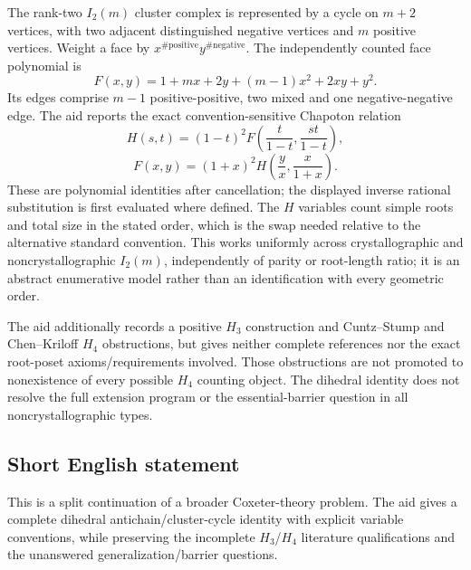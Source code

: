 \documentclass[11pt]{article}
\begin{document}
The rank-two \(I_2(m)\) cluster complex is represented by a cycle on \(m+2\) vertices, with two adjacent distinguished negative vertices and \(m\) positive vertices. Weight a face by \(x^{\#\mathrm{positive}}y^{\#\mathrm{negative}}\). The independently counted face polynomial is
\[
 F(x,y)=1+mx+2y+(m-1)x^2+2xy+y^2.
\]
Its edges comprise \(m-1\) positive-positive, two mixed and one negative-negative edge. The aid reports the exact convention-sensitive Chapoton relation
\[
 H(s,t)=(1-t)^2F\left(\frac{t}{1-t},\frac{st}{1-t}\right),
\]
\[
 F(x,y)=(1+x)^2H\left(\frac yx,\frac{x}{1+x}\right).
\]
These are polynomial identities after cancellation; the displayed inverse rational substitution is first evaluated where defined. The \(H\) variables count simple roots and total size in the stated order, which is the swap needed relative to the alternative standard convention. This works uniformly across crystallographic and noncrystallographic \(I_2(m)\), independently of parity or root-length ratio; it is an abstract enumerative model rather than an identification with every geometric order.

The aid additionally records a positive \(H_3\) construction and Cuntz--Stump and Chen--Kriloff \(H_4\) obstructions, but gives neither complete references nor the exact root-poset axioms/requirements involved. Those obstructions are not promoted to nonexistence of every possible \(H_4\) counting object. The dihedral identity does not resolve the full extension program or the essential-barrier question in all noncrystallographic types.
\subsection{Short English statement}
This is a split continuation of a broader Coxeter-theory problem. The aid gives a complete dihedral antichain/cluster-cycle identity with explicit variable conventions, while preserving the incomplete \(H_3\)/\(H_4\) literature qualifications and the unanswered generalization/barrier questions.
\end{document}
